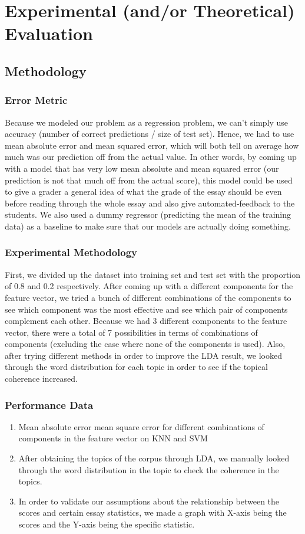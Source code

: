 \documentclass{article}
\begin{document}
\section{Experimental (and/or Theoretical) Evaluation}
\subsection{Methodology}
\subsubsection{Error Metric}
Because we modeled our problem as a regression problem, we can’t simply use accuracy (number of correct predictions / size of test set). Hence, we had to use mean absolute error and mean squared error, which will both tell on average how much was our prediction off from the actual value. In other words, by coming up with a model that has very low mean absolute and mean squared error (our prediction is not that much off from the actual score), this model could be used to give a grader a general idea of what the grade of the essay should be even before reading through the whole essay and also give automated-feedback to the students. 
We also used a dummy regressor (predicting the mean of the training data) as a baseline to make sure that our models are actually doing something.
\subsubsection{Experimental Methodology}
First, we divided up the dataset into training set and test set with the proportion of 0.8 and 0.2 respectively. 
After coming up with a different components for the feature vector, we tried a bunch of different combinations of the components to see which component was the most effective and see which pair of components complement each other. Because we had 3 different components to the feature vector, there were a total of 7 possibilities in terms of combinations of components (excluding the case where none of the components is used). 
Also, after trying different methods in order to improve the LDA result, we looked through the word distribution for each topic in order to see if the topical coherence increased.  
\subsubsection{Performance Data}
\begin{enumerate}
	\item Mean absolute error mean square error for different combinations of components in the feature vector on KNN and SVM
	\item After obtaining the topics of the corpus through LDA, we manually looked through the word distribution in the topic to check the coherence in the topics.
	\item In order to validate our assumptions about the relationship between the scores and certain essay statistics, we made a graph with X-axis being the scores and the Y-axis being the specific statistic.
\end{enumerate}
\end{document}
